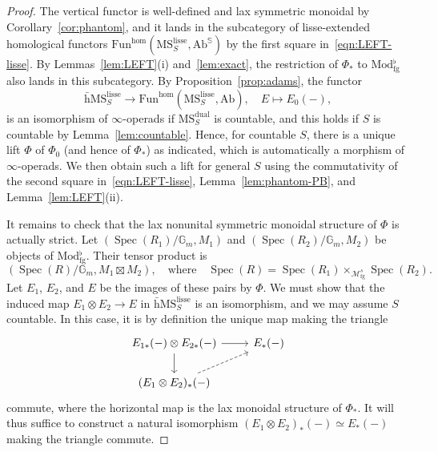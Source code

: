 \documentclass{amsart}
\numberwithin{equation}{section}
\theoremstyle{plain}
\theoremstyle{definition}
\let\scr=\mathcal
\let\bb=\mathbb
\def\G{\mathbb G}
\def\ph{\mathord-}
\DeclareMathOperator{\Spec}{Spec}
\let\cat=\mathrm
\def\Mod{\cat{M}\mathrm{od}{}}
\def\MS{\mathrm{MS}}
\def\Ab{\mathrm{A}\mathrm{b}}
\def\Fun{\mathrm{Fun}}
\def\w{\bar{\mathrm{h}}}
\def\fg{\mathrm{fg}}
\def\lisse{\mathrm{lisse}}
\begin{document}
\begin{proof}
	The vertical functor is well-defined and lax symmetric monoidal by Corollary~\ref{cor:phantom}, and it lands in the subcategory of lisse-extended homological functors $\Fun^\mathrm{hom}(\MS_S^\lisse,\Ab^\bb S)$ by the first square in~\eqref{eqn:LEFT-lisse}.
	By Lemmas~\ref{lem:LEFT}(i) and~\ref{lem:exact}, the restriction of $\Phi_*$ to $\Mod_\fg^\flat$ also lands in this subcategory.
	By Proposition~\ref{prop:adams}, the functor
	\[
	\w\MS_S^\lisse \to \Fun^\mathrm{hom}(\MS_S^\lisse,\Ab), \quad E\mapsto E_0(\ph),
	\]
	is an isomorphism of $\infty$-operads if $\MS_S^\mathrm{dual}$ is countable, and this holds if $S$ is countable by Lemma~\ref{lem:countable}. Hence, for countable $S$, there is a unique lift $\Phi$ of $\Phi_0$ (and hence of $\Phi_*$) as indicated, which is automatically a morphism of $\infty$-operads.
	We then obtain such a lift for general $S$ using the commutativity of the second square in~\eqref{eqn:LEFT-lisse}, Lemma~\ref{lem:phantom-PB}, and Lemma~\ref{lem:LEFT}(ii).
	
	It remains to check that the lax nonunital symmetric monoidal structure of $\Phi$ is actually strict.
	Let $(\Spec(R_1)/\G_m,M_1)$ and $(\Spec(R_2)/\G_m,M_2)$ be objects of $\Mod_\fg^\flat$. Their tensor product is 
	\[
	(\Spec(R)/\G_m,M_1\boxtimes M_2),\quad \text{where}\quad \Spec(R)=\Spec(R_1)\times_{\scr M_\fg^s}\Spec(R_2).
	\]
	Let $E_1$, $E_2$, and $E$ be the images of these pairs by $\Phi$.
	We must show that the induced map $E_1\otimes E_2\to E$ in $\w\MS_S^\lisse$ is an isomorphism, and we may assume $S$ countable.
	In this case, it is by definition the unique map making the triangle
	\[
	\begin{tikzcd}
		E_{1*}(\ph) \otimes E_{2*}(\ph) \ar{r} \ar{d} & E_*(\ph) \\
		(E_1\otimes E_2)_*(\ph) \ar[dashed]{ur}
	\end{tikzcd}
	\]
	commute, where the horizontal map is the lax monoidal structure of $\Phi_*$.
	It will thus suffice to construct a natural isomorphism $(E_1\otimes E_2)_*(\ph)\simeq E_*(\ph)$ making the triangle commute.
	

\end{proof}
\end{document}
